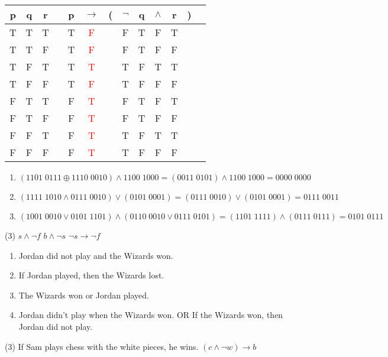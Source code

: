 \begin{Solution}{1.2}
\begin{tasks}
  \task
      \begin{tabular}{@{ }c@{ }@{ }c@{ }@{ }c | c@{ }@{ }c@{ }@{ }c@{ }@{}c@{}@{ }c@{ }@{ }c@{ }@{ }c@{ }@{ }c@{ }@{}c@{}@{ }c}
	p & q & r &  & p & $\rightarrow$ & ( & $\lnot $ & q & $\land$ & r & ) & \\
	\hline
	T & T & T &  & T & \textcolor{red}{F} &  & F & T & F & T &  & \\
	T & T & F &  & T & \textcolor{red}{F} &  & F & T & F & F &  & \\
	T & F & T &  & T & \textcolor{red}{T} &  & T & F & T & T &  & \\
	T & F & F &  & T & \textcolor{red}{F} &  & T & F & F & F &  & \\
	F & T & T &  & F & \textcolor{red}{T} &  & F & T & F & T &  & \\
	F & T & F &  & F & \textcolor{red}{T} &  & F & T & F & F &  & \\
	F & F & T &  & F & \textcolor{red}{T} &  & T & F & T & T &  & \\
	F & F & F &  & F & \textcolor{red}{T} &  & T & F & F & F &  & \\
      \end{tabular}
   \end{tasks}
 
\end{Solution}
\begin{Solution}{1.3}
\quad\begin{fullwidth}
 \begin{enumerate}[label=\alph*),labelindent=0.25cm,leftmargin=*]
  \item $(1101\; 0111 \oplus 1110 \; 0010)\land 1100\; 1000=(0011\; 0101)\land 1100\; 1000=0000\; 0000$
  \item $(1111\; 1010\land 0111\; 0010)\lor (0101\; 0001)=(0111\; 0010)\lor (0101\; 0001)=0111\; 0011$
  \item $(1001\; 0010 \lor 0101\; 1101)\land (0110\;0010\lor 0111\; 0101)=(1101\; 1111)\land (0111\; 0111)=0101\;0111$
 \end{enumerate}
 \end{fullwidth}
\end{Solution}
\begin{Solution}{1.4}
\quad
    \begin{tasks}(3)
        \task $s \land \lnot f$
         \task $b \land \lnot s$
        \task $ \lnot s \to \lnot f$
    \end{tasks}
\end{Solution}
\begin{Solution}{1.5}
\quad
 \begin{enumerate}[label=\alph*),labelindent=0.25cm,leftmargin=*]
  \item Jordan did not play and the Wizards won.
  \item If Jordan played, then the Wizards lost.
  \item The Wizards won or Jordan played.
  \item Jordan didn't play when the Wizards won.
        OR If the   Wizards won, then Jordan did not play.
 \end{enumerate}
\end{Solution}
\begin{Solution}{1.6}
\quad
  \begin{tasks}(3)
       \task If Sam plays chess with the white pieces, he wins.
       \task  $(c\land \lnot w)\to b$
  \end{tasks}
\end{Solution}
